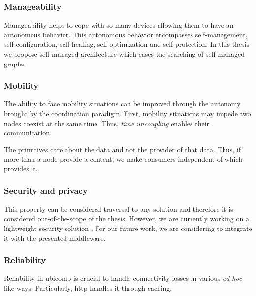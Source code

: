 

\subsubsection{Manageability}

Manageability helps to cope with so many devices allowing them to have an autonomous behavior. %
This autonomous behavior encompasses self-management, self-configuration, self-healing, self-optimization and self-protection.
In this thesis we propose self-managed architecture which eases the searching of self-managed graphs.


\subsubsection{Mobility}

The ability to face mobility situations can be improved through the autonomy brought by the coordination paradigm. %
First, mobility situations may impede two nodes coexist at the same time.
Thus, \emph{time uncoupling} enables their communication.

The primitives care about the data and not the provider of that data.
Thus, if more than a node provide a content, we make consumers independent of which provides it.


\subsubsection{Security and privacy}

This property can be considered traversal to any solution and therefore it is considered out-of-the-scope of the thesis.
However, we are currently working on a lightweight security solution \citep{naranjo_lightweight_2012}. %
For our future work, we are considering to integrate it with the presented middleware.


\subsubsection{Reliability}

Reliability in \ac{ubicomp} is crucial to handle connectivity losses in various \emph{ad hoc}-like ways.
Particularly, \ac{http} handles it through caching.


